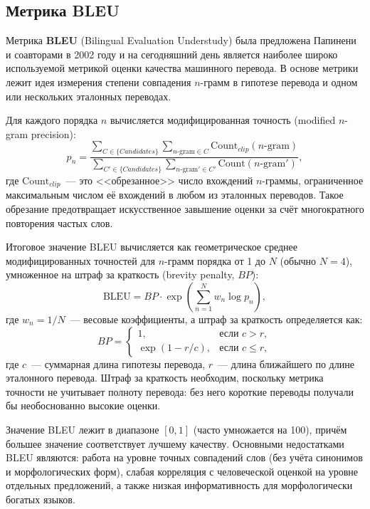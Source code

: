 \documentclass[14pt,a4paper]{extreport}
\begin{document}
\subsection{Метрика BLEU}

Метрика \textbf{BLEU} (Bilingual Evaluation Understudy) была предложена Папинени и соавторами в 2002 году \cite{papineni2002bleu} и на сегодняшний день является наиболее широко используемой метрикой  оценки качества машинного перевода. В основе метрики лежит идея измерения степени совпадения $n$-грамм в гипотезе перевода и одном или нескольких эталонных переводах.

Для каждого порядка $n$ вычисляется модифицированная точность (modified $n$-gram precision):
\begin{equation}
p_n = \frac{\sum_{C \in \{Candidates\}} \sum_{n\text{-gram} \in C} \mathrm{Count}_{clip}(n\text{-gram})}{\sum_{C' \in \{Candidates\}} \sum_{n\text{-gram}' \in C'} \mathrm{Count}(n\text{-gram}')},
\end{equation}
где $\mathrm{Count}_{clip}$~--- это <<обрезанное>> число вхождений $n$-граммы, ограниченное максимальным числом её вхождений в любом из эталонных переводов. Такое обрезание предотвращает искусственное завышение оценки за счёт многократного повторения частых слов.

Итоговое значение BLEU вычисляется как геометрическое среднее модифицированных точностей для $n$-грамм порядка от 1 до $N$ (обычно $N = 4$), умноженное на штраф за краткость (brevity penalty, $BP$):
\begin{equation}
\mathrm{BLEU} = BP \cdot \exp\left(\sum_{n=1}^{N} w_n \log p_n\right),
\end{equation}
где $w_n = 1/N$~--- весовые коэффициенты, а штраф за краткость определяется как:
\begin{equation}
BP =
\begin{cases}
1, & \text{если } c > r, \\
\exp\left(1 - r/c\right), & \text{если } c \leq r,
\end{cases}
\end{equation}
где $c$~--- суммарная длина гипотезы перевода, $r$~--- длина ближайшего по длине эталонного перевода. Штраф за краткость необходим, поскольку метрика точности не учитывает полноту перевода: без него короткие переводы получали бы необоснованно высокие оценки.

Значение BLEU лежит в диапазоне $[0, 1]$ (часто умножается на 100), причём большее значение соответствует лучшему качеству. Основными недостатками BLEU являются: работа на уровне точных совпадений слов (без учёта синонимов и морфологических форм), слабая корреляция с человеческой оценкой на уровне отдельных предложений, а также низкая информативность для морфологически богатых языков.
\end{document}
